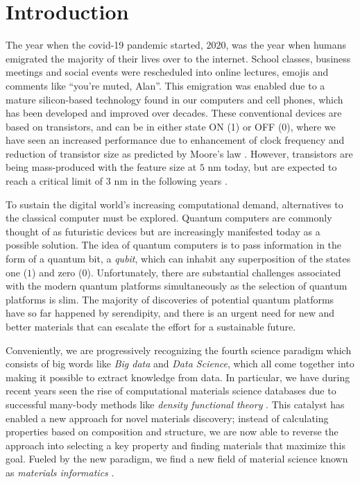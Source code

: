 \chapter{Introduction}

The year when the covid-19 pandemic started, $2020$, was the year when humans emigrated the majority of their lives over to the internet. School classes, business meetings and social events were rescheduled into online lectures, emojis and comments like ``you're muted, Alan''. This emigration was enabled due to a mature silicon-based technology found in our computers and cell phones, which has been developed and improved over decades. These conventional devices are based on transistors, and can be in either state ON (1) or OFF (0), where we have seen an increased performance due to enhancement of clock frequency and reduction of transistor size as predicted by Moore's law \cite{Moore1965, Pavicic2006}. However, transistors are being mass-produced with the feature size at $5$ nm today, but are expected to reach a critical limit of $3$ nm in the following years \cite{Gwennap2020}.



To sustain the digital world's increasing computational demand, alternatives to the classical computer must be explored. Quantum computers are commonly thought of as futuristic devices but are increasingly manifested today as a possible solution. The idea of quantum computers is to pass information in the form of a quantum bit, a \textit{qubit}, which can inhabit any superposition of the states one ($1$) and zero ($0$). Unfortunately, there are substantial challenges associated with the modern quantum platforms simultaneously as the selection of quantum platforms is slim. The majority of discoveries of potential quantum platforms have so far happened by serendipity, and there is an urgent need for new and better materials that can escalate the effort for a sustainable future.

Conveniently, we are progressively recognizing the fourth science paradigm which consists of big words like \textit{Big data} and \textit{Data Science}, which all come together into making it possible to extract knowledge from data. In particular, we have during recent years seen the rise of computational materials science databases \cite{Curtarolo2012, Curtarolo2012a, Calderon2015, Jain2013, Jain2016, Jain2018, Saal2013, Kirklin2015, Choudhary2020, Allen1987} due to successful many-body methods like \textit{density functional theory} \cite{Kohn1965}. This catalyst has enabled a new approach for novel materials discovery; instead of calculating properties based on composition and structure, we are now able to reverse the approach into selecting a key property and finding materials that maximize this goal.
Fueled by the new paradigm, we find a new field of material science known as \textit{materials informatics} \cite{Rajan2005}.

